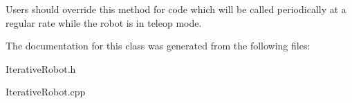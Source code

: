 \-Users should override this method for code which will be called periodically at a regular rate while the robot is in teleop mode. 

\-The documentation for this class was generated from the following files\-:\begin{DoxyCompactItemize}
\item 
\-Iterative\-Robot.\-h\item 
\-Iterative\-Robot.\-cpp\end{DoxyCompactItemize}
